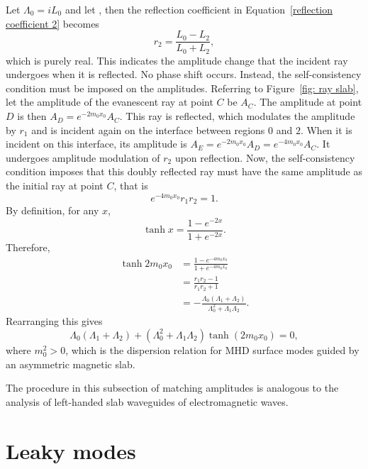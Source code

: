 \documentclass[12pt]{../style-files/ociamthesis}
\begin{document}
	Let $\Lambda_0 = iL_0$ and let , then the reflection coefficient in Equation~\eqref{reflection coefficient 2} becomes
	\begin{equation}
	r_2 = \frac{L_0 - L_2}{L_0 + L_2},
	\end{equation}
	which is purely real. This indicates the amplitude change that the incident ray undergoes when it is reflected. No phase shift occurs. Instead, the self-consistency condition must be imposed on the amplitudes. Referring to Figure~\ref{fig: ray slab}, let the amplitude of the evanescent ray at point $C$ be $A_C$. The amplitude at point $D$ is then $A_D = e^{-2m_0x_0}A_C$. This ray is reflected, which modulates the amplitude by $r_1$ and is incident again on the interface between regions $0$ and $2$. When it is incident on this interface, its amplitude is $A_E = e^{-2m_0x_0}A_D = e^{-4m_0x_0}A_C$. It undergoes amplitude modulation of $r_2$ upon reflection. Now, the self-consistency condition imposes that this doubly reflected ray must have the same amplitude as the initial ray at point $C$, that is
	\begin{equation}
	e^{-4m_0x_0}r_1r_2 = 1.
	\end{equation}
	By definition, for any $x$,
	\begin{equation}
	\tanh{x} = \frac{1 - e^{-2x}}{1 + e^{-2x}}.
	\end{equation}
	Therefore,
	\begin{align}
	\tanh{2m_0x_0} &= \frac{1 - e^{-4m_0x_0}}{1 + e^{-4m_0x_0}} \\
	&= \frac{r_1r_2 - 1}{r_1r_2 + 1} \\
	&= -\frac{\Lambda_0(\Lambda_1 + \Lambda_2)}{\Lambda_0^2 + \Lambda_1\Lambda_2}.
	\end{align}
	Rearranging this gives
	\begin{equation}
	\Lambda_0 (\Lambda_1 + \Lambda_2) + (\Lambda_0^2 + \Lambda_1\Lambda_2)\tanh(2m_0x_0) = 0,
	\end{equation}
	where $m_0^2 > 0$, which is the dispersion relation for MHD surface modes guided by an asymmetric magnetic slab.
	
	The procedure in this subsection of matching amplitudes is analogous to the analysis of left-handed slab waveguides of electromagnetic waves.
	
	
	\section{Leaky modes}
	\label{sec: leaky}
	
\end{document}
